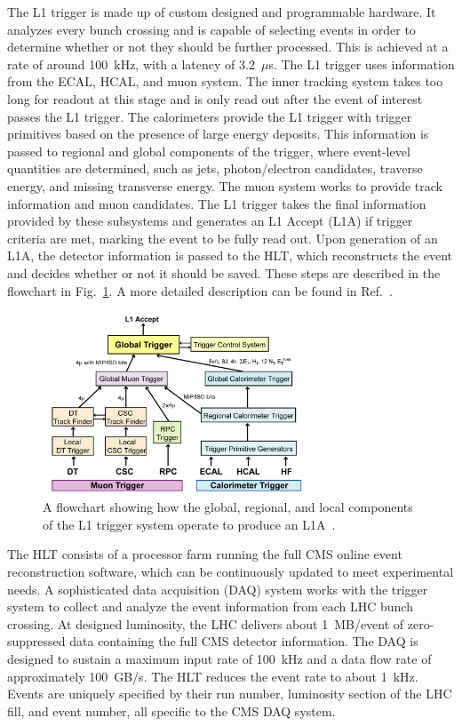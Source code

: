 The L1 trigger is made up of custom designed and programmable hardware. It analyzes every bunch crossing and is capable of selecting events in order to determine whether or not they should be further processed. This is achieved at a rate of around 100~kHz, with a latency of 3.2~$\mu$s. The L1 trigger uses information from the ECAL, HCAL, and muon system. The inner tracking system takes too long for readout at this stage and is only read out after the event of interest passes the L1 trigger. The calorimeters provide the L1 trigger with trigger primitives based on the presence of large energy deposits. This information is passed to regional and global components of the trigger, where event-level quantities are determined, such as jets, photon/electron candidates, traverse energy, and missing transverse energy. The muon system works to provide track information and muon candidates. The L1 trigger takes the final information provided by these subsystems and generates an L1 Accept (L1A) if trigger criteria are met, marking the event to be fully read out. Upon generation of an L1A, the detector information is passed to the HLT, which reconstructs the event and decides whether or not it should be saved. These steps are described in the flowchart in Fig.~\ref{fig:L1_trigger}. A more detailed description can be found in Ref.~\cite{Khachatryan:2016bia}.

\begin{figure}[!htb]
	\centering
	\includegraphics[width=0.70\textwidth]{figures/L1_trigger.png}
	\caption{A flowchart showing how the global, regional, and local components of the L1 trigger system operate to produce an L1A~\cite{Chatrchyan:2008aa}.}
	\label{fig:L1_trigger}
\end{figure}


The HLT consists of a processor farm running the full CMS online event reconstruction software, which can be continuously updated to meet experimental needs. A sophisticated data acquisition (DAQ) system works with the trigger system to collect and analyze the event information from each LHC bunch crossing. At designed luminosity, the LHC delivers about 1~MB/event of zero-suppressed data containing the full CMS detector information. The DAQ is designed to sustain a maximum input rate of 100~kHz and a data flow rate of approximately 100~GB/s. The HLT reduces the event rate to about 1~kHz. Events are uniquely specified by their run number, luminosity section of the LHC fill, and event number, all specific to the CMS DAQ system.



